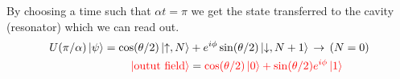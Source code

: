 \begin{enumerate}
 	By choosing a time  such that $ \alpha t =  \pi $ we get the state  transferred to the cavity
        (resonator) which we can read out.
 	\[
          \begin{aligned}
            U(\pi/\alpha)\ket{\psi} = \cos(\theta/2)\Ket{\uparrow, N} & + e^{i\phi}\sin(\theta/2)\Ket{\downarrow, N+1} \,\rightarrow\, (N = 0)\\
            {\color{red}{\ket{\text{outut field}}}} &= {\color{red}{\cos(\theta/2)\ket{0} + \sin(\theta/2)e^{i\phi}\ket{1}}}
          \end{aligned}
 	\]
 	
      \end{enumerate}

